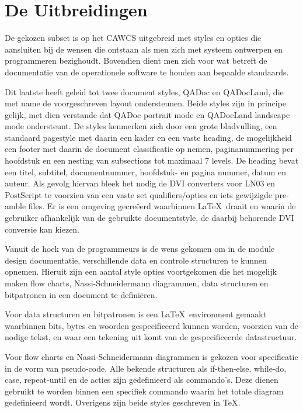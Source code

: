 \section{De Uitbreidingen}

De gekozen subset is op het CAWCS uitgebreid met styles en opties die aansluiten
bij de wensen die ontstaan als men zich met systeem ontwerpen en programmeren
bezighoudt. Bovendien dient men zich voor wat betreft de documentatie van de
operationele software te houden aan bepaalde standaards.

Dit laatste heeft geleid tot twee document styles, QADoc en QADocLand, die met
name de voorgeschreven layout ondersteunen. Beide styles zijn in principe
gelijk, met dien verstande dat QADoc portrait mode en QADocLand landscape mode
ondersteunt. De styles kenmerken zich door een grote bladvulling, een standaard
pagestyle met daarin een kader en een vaste heading, de mogelijkheid een footer
met daarin de document classificatie op nemen, paginanummering per hoofdstuk en
een nesting van subsections tot maximaal 7 levels. De heading bevat een titel,
subtitel, documentnummer, hoofdstuk- en pagina nummer, datum en auteur. Als
gevolg hiervan bleek het nodig de DVI converters voor LN03 en PostScript te
voorzien van een vaste set qualifiers/opties en iets gewijzigde pre-amble files.
Er is een omgeving gecre\"eerd waarbinnen \LaTeX\ draait en waarin de gebruiker
afhankelijk van de gebruikte documentstyle, de daarbij behorende DVI conversie
kan kiezen.

Vanuit de hoek van de programmeurs is de wens gekomen om in de module design
documentatie, verschillende data en controle structuren te kunnen opnemen.
Hieruit zijn een aantal style opties voortgekomen die het mogelijk maken flow
charts, Nassi-Schneidermann diagrammen, data structuren en bitpatronen in een
document te defini\"eren.

Voor data structuren en bitpatronen is een \LaTeX\ environment gemaakt
waarbinnen bits, bytes en woorden gespecificeerd kunnen worden, voorzien van de
nodige tekst, en waar een tekening uit komt van de gespecificeerde
datastructuur.

Voor flow charts en Nassi-Schneidermann diagrammen is gekozen voor specificatie
in de vorm van pseudo-code. Alle bekende structuren als if-then-else, while-do,
case, repeat-until en de acties zijn gedefinieerd als commando's. Deze dienen
gebruikt te worden binnen een specifiek commando waarin het totale diagram
gedefinieerd wordt. Overigens zijn beide styles geschreven in \TeX.

